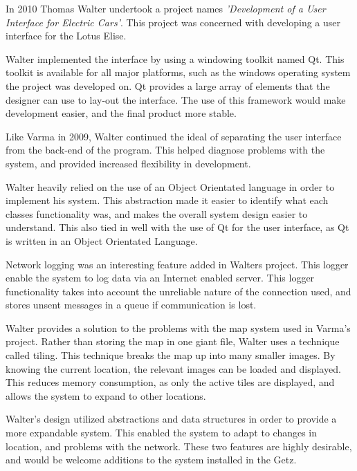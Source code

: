 In 2010 Thomas Walter undertook a project names \emph{'Development of a User Interface
for Electric Cars'}. This project was concerned with developing a user interface for the Lotus Elise.

Walter implemented the interface by using a windowing toolkit named Qt. This toolkit is available for all major platforms, such as the windows operating system the project was developed on. Qt provides a large array of elements that the designer can use to lay-out the interface. The use of this framework would make development easier, and the final product more stable.

Like Varma in 2009, Walter continued the ideal of separating the user interface from the back-end of the program. This helped diagnose problems with the system, and provided increased flexibility in development.

Walter heavily relied on the use of an Object Orientated language in order to implement his system. This abstraction made it easier to identify what each classes functionality was, and makes the overall system design easier to understand. This also tied in well with the use of Qt for the user interface, as Qt is written in an Object Orientated Language.

Network logging was an interesting feature added in Walters project. This logger enable the system to log data via an Internet enabled server. This logger functionality takes into account the unreliable nature of the connection used, and stores unsent messages in a queue if communication is lost.

Walter provides a solution to the problems with the map system used in Varma's project. Rather than storing the map in one giant file, Walter uses a technique called tiling. This technique breaks the map up into many smaller images. By knowing the current location, the relevant images can be loaded and displayed. This reduces memory consumption, as only the active tiles are displayed, and allows the system to expand to other locations.

Walter's design utilized abstractions and data structures in order to provide a more expandable system. This enabled the system to adapt to changes in location, and problems with the network. These two features are highly desirable, and would be welcome additions to the system installed in the Getz.





